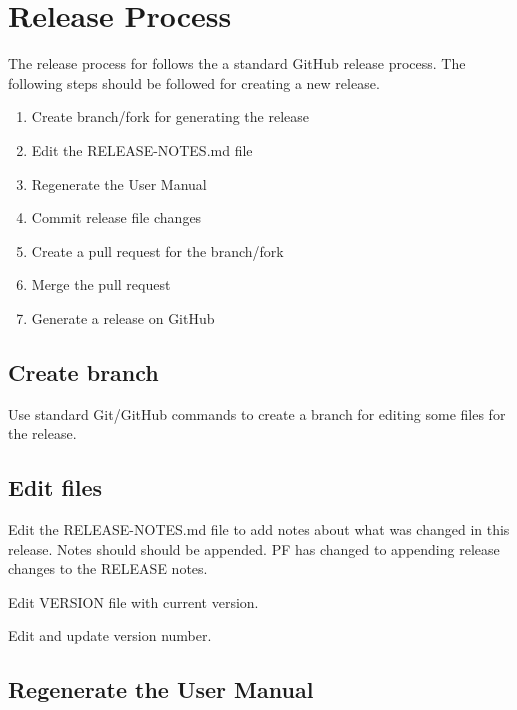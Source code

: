 
\chapter{Release Process}
\label{Release Process}

The release process for \parflow{} follows the a standard GitHub
release process.  The following steps should be followed for creating a new
\parflow{} release.

\begin{enumerate}
	\item Create branch/fork for generating the release
	\item Edit the RELEASE-NOTES.md file
	\item Regenerate the \parflow{} User Manual
        \item Commit release file changes
        \item Create a pull request for the branch/fork
        \item Merge the pull request
        \item Generate a release on GitHub
\end{enumerate}


\section{Create branch}

Use standard Git/GitHub commands to create a branch for editing some files for the release.

\section{Edit files}

Edit the RELEASE-NOTES.md file to add notes about what was changed in
this release.  Notes should should be appended.  PF has changed to appending
release changes to the RELEASE notes.

Edit VERSION file with current version.

Edit  and update version number.

\section{Regenerate the \parflow{} User Manual}

